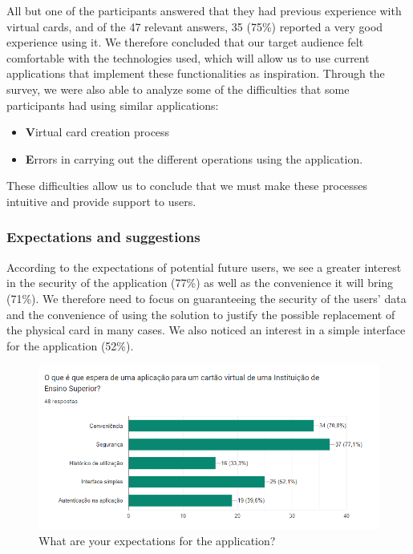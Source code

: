 \documentclass[10pt]{article}
\begin{document}
All but one of the participants answered that they had previous experience with virtual cards, and of the 47 relevant answers, 35 (75\%) reported a very good experience using it. We therefore concluded that our target audience felt comfortable with the technologies used, which will allow us to use current applications that implement these functionalities as inspiration.
Through the survey, we were also able to analyze some of the difficulties that some participants had using similar applications:
\begin{itemize}
    \item \textbf Virtual card creation process
    \item \textbf Errors in carrying out the different operations using the application.
\end{itemize}


These difficulties allow us to conclude that we must make these processes intuitive and provide support to users.



\subsubsection{Expectations and suggestions}

According to the expectations of potential future users, we see a greater interest in the security of the application (77\%) as well as the convenience it will bring (71\%). We therefore need to focus on guaranteeing the security of the users' data and the convenience of using the solution to justify the possible replacement of the physical card in many cases.
We also noticed an interest in a simple interface for the application (52\%).

\begin{figure}[h]
    \centering
    \includegraphics[width=1\textwidth]{report-images/questionaire4.png}
    \caption{What are your expectations for the application?}
\end{figure}
\end{document}
